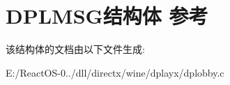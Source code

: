 \hypertarget{struct_d_p_l_m_s_g}{}\section{D\+P\+L\+M\+S\+G结构体 参考}
\label{struct_d_p_l_m_s_g}


该结构体的文档由以下文件生成\+:\begin{DoxyCompactItemize}
\item 
E\+:/\+React\+O\+S-\/0../dll/directx/wine/dplayx/dplobby.\+c\end{DoxyCompactItemize}
